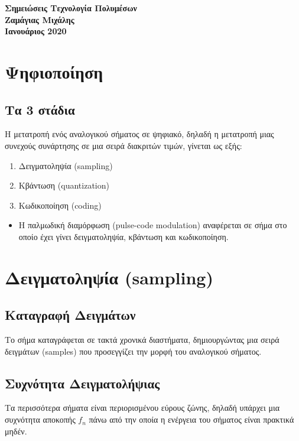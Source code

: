 \documentclass[a4paper,12pt]{article}
\begin{document}
\begin{titlepage}
    \begin{center}
        \vspace*{\fill}
        \huge\textbf{Σημειώσεις Τεχνολογία Πολυμέσων\\}
        \vspace*{\fill}
        \vfill
        \normalsize\textbf{Ζαμάγιας Μιχάλης\\}
        \small\textbf{Ιανουάριος 2020\\}
        \vfill
    \end{center}
\end{titlepage}

\tableofcontents

\newpage\section{Ψηφιοποίηση}
\subsection{Τα 3 στάδια}
Η μετατροπή ενός αναλογικού σήματος σε ψηφιακό, δηλαδή η
μετατροπή μιας συνεχούς συνάρτησης σε μια σειρά διακριτών
τιμών, γίνεται ως εξής:
\begin{enumerate}
    \item Δειγματοληψία (sampling)
    \item Κβάντωση (quantization)
    \item Κωδικοποίηση (coding)
\end{enumerate}
\begin{itemize}
    \item Η παλμωδική διαμόρφωση (pulse-code modulation)
          αναφέρεται σε σήμα στο οποίο έχει γίνει δειγματοληψία,
          κβάντωση και κωδικοποίηση.
\end{itemize}

\newpage\section{Δειγματοληψία (sampling)}
\subsection{Καταγραφή Δειγμάτων}
Το σήμα καταγράφεται σε τακτά χρονικά διαστήματα, δημιουργώντας
μια σειρά δειγμάτων (samples) που προσεγγίζει την μορφή του
αναλογικού σήματος.
\subsection{Συχνότητα Δειγματολήψιας}
Τα περισσότερα σήματα είναι περιορισμένου εύρους ζώνης, δηλαδή
υπάρχει μια συχνότητα αποκοπής $f_{n}$ πάνω από την οποία η
ενέργεια του σήματος είναι πρακτικά μηδέν.
\end{document}
